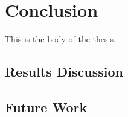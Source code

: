 \chapter{Conclusion}

This is the body of the thesis.

\section{Results Discussion}

\section{Future Work}